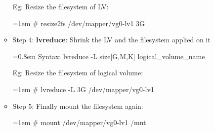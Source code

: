 \begin{flushleft}
\begin{itemize}
\begin{itemize}
		Eg: Resize the filesystem of LV:
		\begin{tcolorbox}[breakable,notitle,boxrule=-0pt,colback=black,colframe=black]
			\color{green}
			\font=1em
			\# resize2fs /dev/mapper/vg0-lv1 3G
			\font=4pt
		\end{tcolorbox}
		
		\item Step 4:
		\newline
		\textbf{lvreduce}: Shrink the LV and the filesystem applied on it
		\begin{tcolorbox}[breakable,notitle,boxrule=-0pt,colback=pink,colframe=pink]
			\color{black}
			\font=0.8em
			Syntax: lvreduce -L size[G,M,K] logical\_volume\_name
			\font=4pt
		\end{tcolorbox}
		
		Eg: Resize the filesystem of logical volume:
		\begin{tcolorbox}[breakable,notitle,boxrule=-0pt,colback=black,colframe=black]
			\color{green}
			\font=1em
			\# lvreduce -L 3G /dev/mapper/vg0-lv1
			\font=4pt
		\end{tcolorbox}
		
		\item Step 5:
		\newline
		Finally mount the filesystem again:
		\begin{tcolorbox}[breakable,notitle,boxrule=-0pt,colback=black,colframe=black]
			\color{green}
			\font=1em
			\# mount /dev/mapper/vg0-lv1  /mnt
			\font=4pt
		\end{tcolorbox}
		
	\end{itemize}

	
	\end{itemize}

	
\end{flushleft}
\newpage
	
